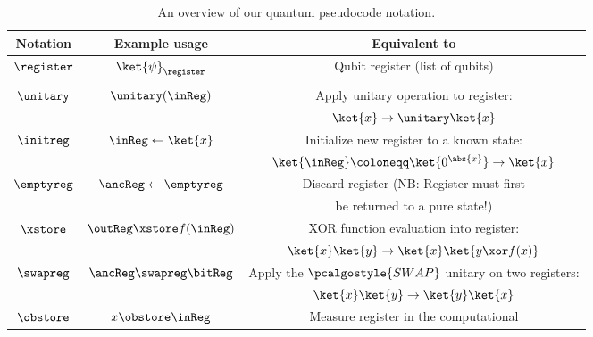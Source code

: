     \begin{table}[h]
      \centering
      \caption{
        \label{tab:pseudocode}
        An overview of our quantum pseudocode notation.
      }
      {\setlength{\tabcolsep}{6pt}
      \begin{tabular}{ccc}
        \toprule
        Notation & Example usage & Equivalent to \\
        \midrule
        $\register$ & $\ket{\psi}_{\register}$ & Qubit register (list of qubits) \\
        \\
        $\unitary$ & $\unitary(\inReg)$ & Apply unitary operation to register: \\
        && $\ket{x} \to \unitary \ket{x}$ \\
        $\initreg$ & $\inReg \gets \ket{x}$ & Initialize new register to a known state: \\
        && $\ket{\inReg} \coloneqq \ket{0^{\abs{x}}} \to \ket{x}$\\
        $\emptyreg$ & $\ancReg \gets \emptyreg$ & Discard register (NB: Register must first \\
        && be returned to a pure state!) \\
        $\xstore$ & $\outReg \xstore f(\inReg)$ & XOR function evaluation into register: \\
        & %
        & $\ket{x}\ket{y} \to \ket{x}\ket{y \xor f(x)}$ \\
        $\swapreg$ & $\ancReg \swapreg \bitReg$ & Apply the $\pcalgostyle{SWAP}$ unitary on two registers: \\
        && $\ket{x}\ket{y} \to \ket{y}\ket{x}$ \\
        $\obstore$ & $x \obstore \inReg$ & Measure register in the computational \\

\end{tabular}}
\end{table}
